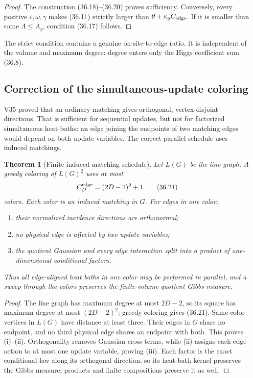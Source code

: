 \documentclass[11pt]{article}
\newtheorem{theorem}{Theorem}[section]
\theoremstyle{remark}
\begin{document}
\begin{proof}
The construction (36.18)--(36.20) proves sufficiency.  Conversely,
every positive \(\varepsilon,\omega,\gamma\) makes (36.11) strictly
larger than \(\theta+\kappa_gC_{\rm edge}\).  If it is smaller than
some \(\Lambda\leq A_g\), condition (36.17) follows.
\end{proof}

The strict condition contains a genuine on-site-to-edge ratio.  It is
independent of the volume and maximum degree; degree enters only the
Higgs coefficient sum (36.8).

\subsection{Correction of the simultaneous-update coloring}

V35 proved that an ordinary matching gives orthogonal, vertex-disjoint
directions.  That is sufficient for sequential updates, but not for
factorized simultaneous heat baths: an edge joining the endpoints of
two matching edges would depend on both update variables.  The correct
parallel schedule uses induced matchings.

\begin{theorem}[Finite induced-matching schedule]
\label{thm:v17v36-induced}
Let \(L(G)\) be the line graph.  A greedy coloring of \(L(G)^2\) uses at
most
\[
 C_D^{\rm edge}=(2D-2)^2+1                        \tag{36.21}
\]
colors.  Each color is an induced matching in \(G\).  For edges in one
color:
\begin{enumerate}[label=\textup{(\roman*)},leftmargin=3em]
\item their normalized incidence directions are orthonormal;
\item no physical edge is affected by two update variables;
\item the quotient Gaussian and every edge interaction split into a
product of one-dimensional conditional factors.
\end{enumerate}
Thus all edge-aligned heat baths in one color may be performed in
parallel, and a sweep through the colors preserves the finite-volume
quotient Gibbs measure.
\end{theorem}

\begin{proof}
The line graph has maximum degree at most \(2D-2\), so its square has
maximum degree at most \((2D-2)^2\); greedy coloring gives (36.21).
Same-color vertices in \(L(G)\) have distance at least three.  Their
edges in \(G\) share no endpoint, and no third physical edge shares an
endpoint with both.  This proves (i)--(ii).  Orthogonality removes
Gaussian cross terms, while (ii) assigns each edge action to at most one
update variable, proving (iii).  Each factor is the exact conditional
law along its orthogonal direction, so its heat-bath kernel preserves
the Gibbs measure; products and finite compositions preserve it as
well.
\end{proof}
\end{document}
